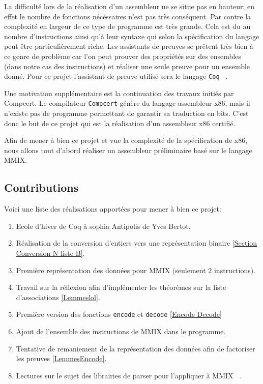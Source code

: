 \documentclass {article}
\theoremstyle{definition}
\theoremstyle{remark}
\newcommand{\fun}[1]{\lstinline!#1!}
\begin{document}
La difficulté lors de la réalisation d'un assembleur ne se situe pas en hauteur; en effet le nombre de
fonctions nécéssaires n'est pas très conséquent. Par contre la complexité en largeur
de ce type de programme est très grande. Cela est du au nombre d'instructions ainsi qu'à leur syntaxe qui selon
la spécification du langage peut être particulièrement riche.
Les assistants de preuves se prêtent très bien à ce genre de problème car l'on peut prouver des
propriétés sur des ensembles (dans notre cas des instructions) et réaliser une seule preuve pour
un ensemble donné. Pour ce projet l'assistant de preuve utilisé sera le langage \fun{Coq} ~\citep{bertot:coqart}.

Une motivation supplémentaire est la continuation des travaux initiés par Compcert.
Le compilateur \fun{Compcert} génère du langage assembleur x86, mais il n'existe pas
de programme permettant de garantir sa traduction en bits.
C'est donc le but de ce projet qui est la réalisation d'un assembleur x86 certifié.

Afin de mener à bien ce projet et vue la complexité de la spécification de x86,
nous allons tout d'abord réaliser un assembleur préliminaire basé sur le langage MMIX.



\subsection{Contributions}
Voici une liste des réalisations apportées pour mener à bien ce projet:
\begin{enumerate}
\item Ecole d'hiver de Coq à sophia Antipolis de Yves Bertot.
\item Réalisation de la conversion d'entiers vers une représentation binaire \ref{Section Conversion N liste B}.
\item Première représentation des données pour MMIX (seulement 2 instructions).
\item Travail sur la réflexion afin d'implémenter les théorèmes sur la liste d'associations \ref{Lemmeslol}.
\item Première version des fonctions \fun{encode} et \fun{decode} \ref{Encode Decode}
\item Ajout de l'ensemble des instructions de MMIX dans le programme.
\item Tentative de remaniement de la représentation des données afin de factoriser les preuves \ref{LemmesEncode}.
\item Lectures sur le sujet des librairies de parser pour l'appliquer à MMIX ~\citep{Swierstra2008CombinatorPA}.
\end{enumerate}
\end{document}
